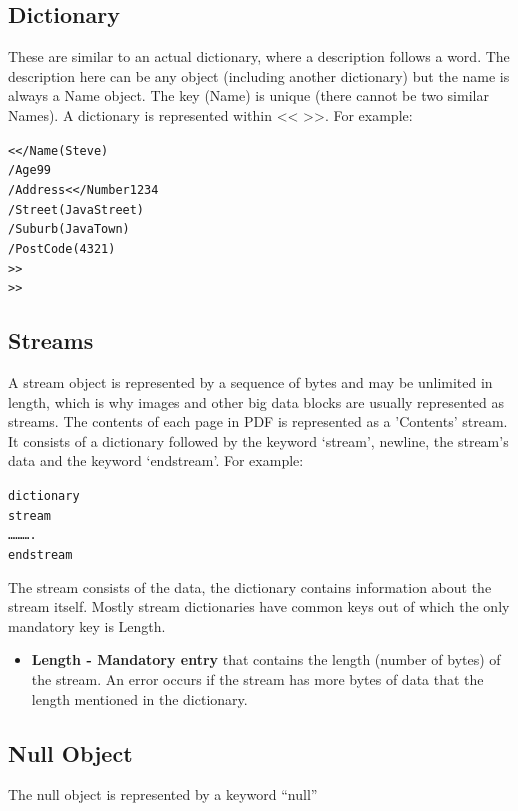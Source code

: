 \subsection{Dictionary}

These are similar to an actual dictionary, where a description follows a word. The description here can be any object (including another dictionary) but the name is always a Name object. The key (Name) is unique (there cannot be two similar Names). A dictionary is represented within << >>. For example:

\begin{alltt}
	<< /Name (Steve)
	/Age 99
	/Address << /Number 1234
	                /Street (Java Street)
	                /Suburb (Java Town)
	                /PostCode (4321)
	>>
	>> 
\end{alltt}

\subsection{Streams}

A stream object is represented by a sequence of bytes and may be unlimited in length, which is why images and other big data blocks are usually represented as streams. The contents of each page in PDF is represented as a 'Contents' stream. It consists of a dictionary followed by the keyword ‘stream’, newline, the stream’s data and the keyword ‘endstream’. For example:

\begin{alltt}
	dictionary
	stream
	……….
	endstream
\end{alltt}

The stream consists of the data, the dictionary contains information about the stream itself. Mostly stream dictionaries have common keys out of which the only mandatory key is Length.

\begin{itemize}
	\item \textbf{Length - Mandatory entry} that contains the length (number of bytes) of the stream. An error occurs if the stream has more bytes of data that the length mentioned in the dictionary.
\end{itemize}

\subsection{Null Object}

The null object is represented by a keyword “null”



